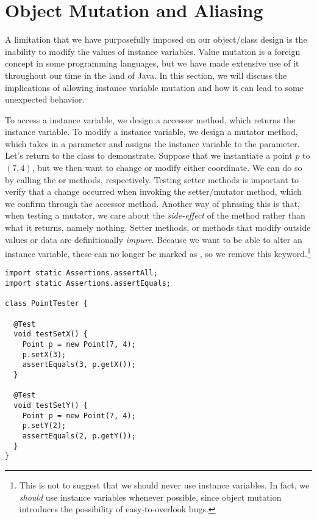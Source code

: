 \section{Object Mutation and Aliasing}
\label{sec:object-mutation-and-aliasing}
A limitation that we have purposefully imposed on our object/class design is the inability to modify the values of instance variables. Value mutation is a foreign concept in some programming languages, but we have made extensive use of it throughout our time in the land of Java. In this section, we will discuss the implications of allowing instance variable mutation and how it can lead to some unexpected behavior.

To access a  instance variable, we design a  accessor method, which returns the instance variable. To modify a  instance variable, we design a  mutator method, which takes in a parameter and assigns the instance variable to the parameter. Let's return to the  class to demonstrate. Suppose that we instantiate a point $p$ to $(7, 4)$, but we then want to change or modify either coordinate. We can do so by calling the  or  methods, respectively. Testing setter methods is important to verify that a change occurred when invoking the setter/mutator method, which we confirm through the accessor method. Another way of phrasing this is that, when testing a mutator, we care about the \emph{side-effect} of the method rather than what it returns, namely nothing. Setter methods, or methods that modify outside values or data are definitionally \emph{impure}. Because we want to be able to alter an instance variable, these can no longer be marked as , so we remove this keyword.\footnote{This is not to suggest that we should never use  instance variables. In fact, we \emph{should} use  instance variables whenever possible, since object mutation introduces the possibility of easy-to-overlook bugs.}

\begin{lstlisting}[language=MyJava]
import static Assertions.assertAll;
import static Assertions.assertEquals;

class PointTester {

  @Test
  void testSetX() {
    Point p = new Point(7, 4);
    p.setX(3);
    assertEquals(3, p.getX());
  }

  @Test
  void testSetY() {
    Point p = new Point(7, 4);
    p.setY(2);
    assertEquals(2, p.getY());
  }
}
\end{lstlisting}

